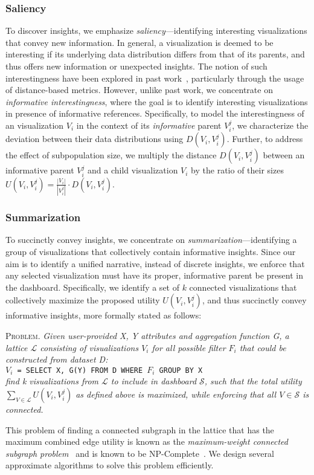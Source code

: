 \subsubsection{Saliency}
To discover insights, we emphasize \emph{saliency}---identifying interesting visualizations that convey new information. In general, a visualization is deemed to be interesting if its underlying data distribution differs from that of its parents, and thus offers new information or unexpected insights. The notion of such interestingness have been explored in past work~\cite{Vartak2015,Correll2016,Itti2009}, particularly through the usage of distance-based metrics. However, unlike past work, we concentrate on \emph{informative interestingness}, where the goal is to identify interesting visualizations in presence of informative references. Specifically, to model the interestingness of an visualization $V_i$ in the context of its \emph{informative} parent $V_i^j$, we characterize the deviation between their data distributions using $D(V_i, V_i^j)$.  Further, to address the effect of subpopulation size, we multiply the distance $D(V_i, V_i^j)$ between an informative parent $V_i^j$ and a child visualization $V_i$ by the ratio of their sizes  $U(V_i, V_i^j) = \frac{|V_i|}{|V_i^{j}|} \cdot D(V_i, V_i^j)$.
\subsubsection{Summarization}
To succinctly convey insights, we concentrate on \emph{summarization}---identifying a group of visualizations that collectively contain informative insights. Since our aim is to identify a unified narrative, instead of discrete insights, we enforce that any selected visualization must have its proper, informative parent be present in the dashboard. Specifically, we identify a set of $k$ connected visualizations that collectively maximize the proposed utility $U(V_i, V_i^j)$, and thus succinctly convey informative insights, more formally stated as follows:

\par \textsc{Problem.} \textit{Given user-provided X, Y attributes and aggregation function G, a lattice $\mathcal{L}$ consisting of visualizations $V_i$ for all possible filter $F_i$ that could be constructed from dataset D:} 
\\ \texttt{$V_i$ = SELECT X, G(Y) FROM D WHERE $F_i$ GROUP BY X}
\\ \textit{find k visualizations from $\mathcal{L}$ to include in dashboard $\mathcal{S}$, such that the total utility $\sum_{V\in \mathcal{L}} U(V_i, V_i^j)$ as defined above is maximized, while enforcing that all $V\in \mathcal{S}$ is connected.}

This problem of finding a connected subgraph in the lattice that has the maximum combined edge utility is known as the \emph{maximum-weight connected subgraph problem}~\cite{ErnstAlthaus2009} and is known to be NP-Complete~\cite{Parameswaran2010}. We design several approximate algorithms to solve this problem efficiently. 